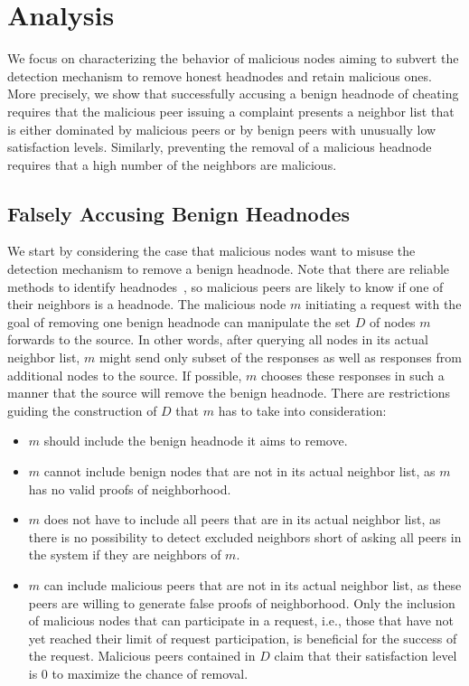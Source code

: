 \section{Analysis}
\label{sec:analysis}


We focus on characterizing the behavior of malicious nodes aiming to subvert the detection mechanism to remove honest headnodes and retain malicious ones. 
More precisely, we show that successfully accusing a benign headnode of cheating requires that the malicious peer issuing a complaint presents a neighbor list that is either dominated by malicious peers or by benign peers with unusually low satisfaction levels.
Similarly, preventing the removal of a malicious headnode requires that a high number of the  neighbors are malicious.



\subsection{Falsely Accusing Benign Headnodes}

We start by considering the case that malicious nodes want to misuse the detection mechanism to remove a benign headnode. 
Note that there are reliable methods to identify headnodes~\cite{nguyen2016swap}, so malicious peers are likely to know if one of their neighbors is a headnode.  
The malicious node $m$ initiating a request with the goal of removing one benign headnode can manipulate the set $D$ of nodes $m$ forwards to the source. 
In other words, after querying all nodes in its actual neighbor list, $m$ might send only  subset of the responses as well as responses from additional nodes to the source. If possible, $m$ chooses these responses in such a manner that the source will remove the benign headnode. 
There are restrictions guiding the construction of $D$ that $m$ has to take into consideration:
\begin{itemize}
\item $m$ should include the benign headnode it aims to remove. 
\item $m$ cannot include benign nodes that are not in its actual neighbor list, as $m$ has no valid proofs of neighborhood. 
\item $m$ does not have to include all peers that are in its actual neighbor list, as there is no possibility to detect excluded neighbors short of asking all peers in the system if they are neighbors of $m$. 
\item $m$ can include malicious peers that are not in its actual neighbor list, as these peers are willing to generate false proofs of neighborhood. Only the inclusion of malicious nodes that can participate in a \drop request, i.e., those that have not yet reached their limit of \drop request participation, is beneficial for the success of the request. Malicious peers contained in $D$ claim that their satisfaction level is 0 to maximize the chance of removal. 
\end{itemize}

